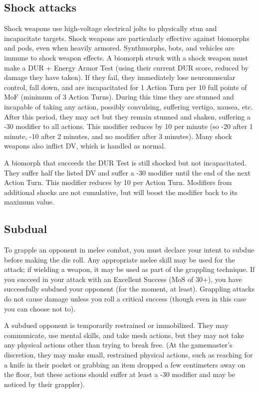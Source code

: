 \subsection{Shock attacks}
\label{sec:shock-attacks}

Shock weapons use high-voltage electrical jolts to physically stun and incapacitate targets. Shock weapons are particularly effective against biomorphs and pods, even when heavily armored. Synthmorphs, bots, and vehicles are immune to shock weapon effects. A biomorph struck with a shock weapon must make a DUR + Energy Armor Test (using their current DUR score, reduced by damage they have taken). If they fail, they immediately lose neuromuscular control, fall down, and are incapacitated for 1 Action Turn per 10 full points of MoF (minimum of 3 Action Turns). During this time they are stunned and incapable of taking any action, possibly convulsing, suffering vertigo, nausea, etc. After this period, they may act but they remain stunned and shaken, suffering a -30 modifier to all actions. This modifier reduces by 10 per minute (so -20 after 1 minute, -10 after 2 minutes, and no modifier after 3 minutes). Many shock weapons also inflict DV, which is handled as normal.

A biomorph that succeeds the DUR Test is still shocked but not incapacitated. They suffer half the listed DV and suffer a -30 modifier until the end of the next Action Turn. This modifier reduces by 10 per Action Turn. Modifiers from additional shocks are not cumulative, but will boost the modifier back to its maximum value.


\subsection{Subdual}
\label{sec:subdual}

To grapple an opponent in melee combat, you must declare your intent to subdue before making the die roll. Any appropriate melee skill may be used for the attack; if wielding a weapon, it may be used as part of the grappling technique. If you succeed in your attack with an Excellent Success (MoS of 30+), you have successfully subdued your opponent (for the moment, at least). Grappling attacks do not cause damage unless you roll a critical success (though even in this case you can choose not to).

A subdued opponent is temporarily restrained or immobilized. They may communicate, use mental skills, and take mesh actions, but they may not take any physical actions other than trying to break free. (At the gamemaster’s discretion, they may make small, restrained physical actions, such as reaching for a knife in their pocket or grabbing an item dropped a few centimeters away on the floor, but these actions should suffer at least a -30 modifier and may be noticed by their grappler).


